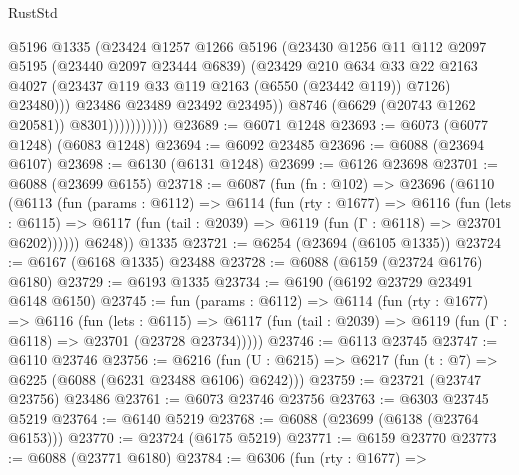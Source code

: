 \begin{lexlean}{RustStd}
\begin{coremodule}
                              @5196
                              @1335
                              (@23424
                                @1257
                                @1266
                                @5196
                                (@23430
                                  @1256
                                  @11
                                  @112
                                  @2097
                                  @5195
                                  (@23440 @2097 @23444 @6839)
                                  (@23429
                                    @210
                                    @634
                                    @33
                                    @22
                                    @2163
                                    @4027
                                    (@23437 @119 @33 @119 @2163 (@6550 (@23442 @119)) @7126)
                                    @23480)))
                              @23486
                              @23489
                              @23492
                              @23495))
                          @8746
                          (@6629 (@20743 @1262 @20581))
                          @8301)))))))))))
@23689 := @6071 @1248
@23693 := @6073 (@6077 @1248) (@6083 @1248)
@23694 := @6092 @23485
@23696 := @6088 (@23694 @6107)
@23698 := @6130 (@6131 @1248)
@23699 := @6126 @23698
@23701 := @6088 (@23699 @6155)
@23718 := @6087
    (fun (fn : @102) =>
    @23696
      (@6110
        (@6113
          (fun (params : @6112) =>
          @6114
            (fun (rty : @1677) =>
            @6116
              (fun (lets : @6115) =>
              @6117 (fun (tail : @2039) => @6119 (fun (Γ : @6118) => @23701 @6202))))))
        @6248))
    @1335
@23721 := @6254 (@23694 (@6105 @1335))
@23724 := @6167 (@6168 @1335) @23488
@23728 := @6088 (@6159 (@23724 @6176) @6180)
@23729 := @6193 @1335
@23734 := @6190 (@6192 @23729 @23491 @6148 @6150)
@23745 := fun (params : @6112) =>
  @6114
    (fun (rty : @1677) =>
    @6116
      (fun (lets : @6115) =>
      @6117 (fun (tail : @2039) => @6119 (fun (Γ : @6118) => @23701 (@23728 @23734)))))
@23746 := @6113 @23745
@23747 := @6110 @23746
@23756 := @6216
    (fun (U : @6215) => @6217 (fun (t : @7) => @6225 (@6088 (@6231 @23488 @6106) @6242)))
@23759 := @23721 (@23747 @23756) @23486
@23761 := @6073 @23746 @23756
@23763 := @6303 @23745 @5219
@23764 := @6140 @5219
@23768 := @6088 (@23699 (@6138 (@23764 @6153)))
@23770 := @23724 (@6175 @5219)
@23771 := @6159 @23770
@23773 := @6088 (@23771 @6180)
@23784 := @6306
    (fun (rty : @1677) =>

\end{coremodule}
\end{lexlean}
